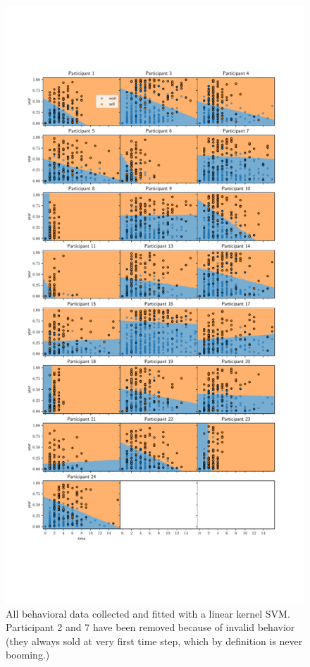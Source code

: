 \documentclass{article}
\begin{document}
\begin{figure}
    \centering
    \includegraphics[width=0.99\linewidth]{img/all_peeps.pdf}
    \caption{All behavioral data collected and fitted with a linear kernel SVM. Participant 2 and 7 have been removed because of invalid behavior (they always sold at very first time step, which by definition is never booming.)}
    \label{fig:all_beh}
\end{figure}
\end{document}
